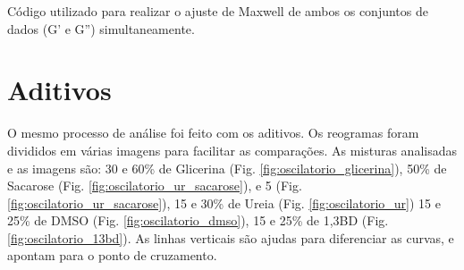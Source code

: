 	\begin{listing}[h]
		\inputminted{python}{./python/ajuste_maxwell.py}
		\caption{Código utilizado para realizar o ajuste de Maxwell de ambos os conjuntos de dados (G' e G'') simultaneamente.}
		\label{lst:ajuste_maxwell}
	\end{listing}
	
	\FloatBarrier
	
	\section{Aditivos}
	
	O mesmo processo de análise foi feito com os aditivos. Os reogramas foram divididos em várias imagens para facilitar as comparações. As misturas analisadas e as imagens são: 30 e 60\% de Glicerina (Fig. \ref{fig:oscilatorio_glicerina}), 50\% de Sacarose (Fig. \ref{fig:oscilatorio_ur_sacarose}), e 5 (Fig. \ref{fig:oscilatorio_ur_sacarose}), 15 e 30\% de Ureia (Fig. \ref{fig:oscilatorio_ur}) 15 e 25\% de DMSO (Fig. \ref{fig:oscilatorio_dmso}), 15 e 25\% de 1,3BD (Fig. \ref{fig:oscilatorio_13bd}). As linhas verticais são ajudas para diferenciar as curvas, e apontam para o ponto de cruzamento.
	
